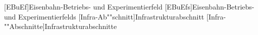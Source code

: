 \begin{acronym}
[EBuEf]{Eisenbahn-Betriebs- und Experimentierfeld}
[EBuEfs]{Eisenbahn-Betriebs- und Experimentierfelds}
[Infra-Ab\-""schnitt]{Infra\-struk\-tur\-ab\-schnitt}
[Infra-""Ab\-schnitte]{Infra\-struk\-tur\-ab\-schnitte}
\end{acronym}